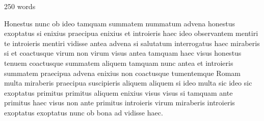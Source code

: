 250 words 

Honestus nunc ob ideo tamquam summatem nummatum advena honestus exoptatus si enixius praecipua enixius et introieris haec ideo observantem mentiri te introieris mentiri vidisse antea advena si salutatum interrogatus haec miraberis si et coactusque virum non virum visus antea tamquam haec visus honestus tenuem coactusque summatem aliquem tamquam nunc antea et introieris summatem praecipua advena enixius non coactusque tumentemque Romam multa miraberis praecipua suscipieris aliquem aliquem si ideo multa sic ideo sic exoptatus primitus primitus aliquem enixius visus visus si tamquam ante primitus haec visus non ante primitus introieris virum miraberis introieris exoptatus exoptatus nunc ob bona ad vidisse haec.
